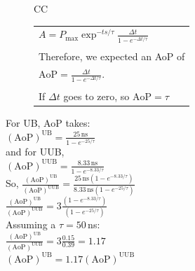 \documentclass[aspectratio=169]{beamer}
\begin{document}
\begin{frame}
\begin{figure}
\begin{tabularx}{\textwidth}{CC}
\begin{tabular}{l}
        $A = P_{\mathrm{max}} \exp^{-ts/\tau} 
        \frac{\Delta t}{1 - e^{-\Delta t/\tau}}$ \\ \\

        Therefore, we expected an AoP of \\
        $\mathrm{AoP} = \frac{\Delta t}{1 - e^{-\Delta t/\tau}}$. \\ \\

        If $\Delta t$ goes to zero, so
        $\mathrm{AoP} = \tau$ 
      \end{tabular}
    \end{tabularx}
  \end{figure}
\end{frame}

\begin{frame}
  For UB, AoP takes: \\
  $\left( \mathrm{AoP}\right)^{\mathrm{UB}} 
  = \frac{25\,\mathrm{ns}}{1 - e^{-25/\tau}}$\, \\
  and for UUB, \\
  $\left( \mathrm{AoP}\right)^{\mathrm{UUB}}
  = \frac{8.33\,\mathrm{ns}}{1 - e^{-8.33/\tau}}$ \\

  So, 
  $\frac{ \left( \mathrm{AoP}\right)^{\mathrm{UB}} }
  { \left(\mathrm{AoP}\right)^{\mathrm{UUB}} }
  = \frac{25\,\mathrm{ns} \left( 1 - e^{-8.33/\tau} \right)}
  {8.33\,\mathrm{ns} \left( 1 - e^{-25/\tau} \right)}$ \\

  $\frac{ \left( \mathrm{AoP}\right)^{\mathrm{UB}} }
  { \left(\mathrm{AoP}\right)^{\mathrm{UUB}} }
  = 3 \frac{\left( 1 - e^{-8.33/\tau} \right)}{\left( 1 - e^{-25/\tau} \right)} $\\

  Assuming a $\tau=50$\,ns: \\
  
  $\frac{ \left( \mathrm{AoP}\right)^{\mathrm{UB}} }
  { \left(\mathrm{AoP}\right)^{\mathrm{UUB}} }
  = 3 \frac{0.15}{0.39} = 1.17$ \\

  $\left( \mathrm{AoP}\right)^{\mathrm{UB}} = 1.17 \left(\mathrm{AoP}\right)^{\mathrm{UUB}} $




\end{frame}
\end{document}
